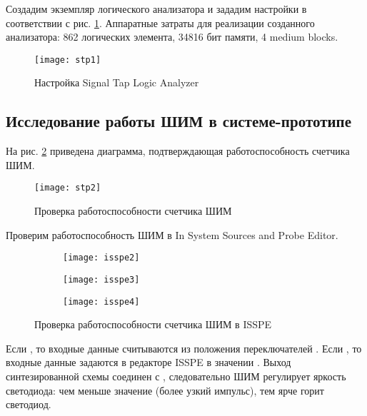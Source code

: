 Создадим экземпляр логического анализатора  и зададим настройки в соответствии с рис. \ref{fig:stp1}. Аппаратные затраты для реализации созданного анализатора: 862 логических элемента, 34816 бит памяти, 4 medium blocks.

\begin{figure}[H]
	\begin{center}
		\texttt{[image: stp1]}
		\caption{Настройка Signal Tap Logic Analyzer}
		\label{fig:stp1}
	\end{center}
\end{figure}
\vspace{-0.5cm}

\subsection{Исследование работы ШИМ в системе-прототипе}

На рис. \ref{fig:stp2} приведена диаграмма, подтверждающая работоспособность счетчика ШИМ.
\begin{figure}[H]
	\begin{center}
		\texttt{[image: stp2]}
		\caption{Проверка работоспособности счетчика ШИМ}
		\label{fig:stp2}
	\end{center}
\end{figure}
\vspace{-0.5cm}

Проверим работоспособность ШИМ в In System Sources and Probe Editor.
\begin{figure}[H]
	\centering
	\begin{subfigure}[b]{\textwidth}
		\centering
		\texttt{[image: isspe2]}
		\vspace{0.2cm}
	\end{subfigure}
	\begin{subfigure}[b]{\textwidth}
		\centering
		\texttt{[image: isspe3]}
		\vspace{0.2cm}
	\end{subfigure}
	\begin{subfigure}[b]{\textwidth}
		\centering
		\texttt{[image: isspe4]}
	\end{subfigure}
	\caption{Проверка работоспособности счетчика ШИМ в ISSPE}
	\label{fig:isspe2}
\end{figure}

Если , то входные данные считываются из положения переключателей . Если , то входные данные задаются в редакторе ISSPE в значении . Выход синтезированной схемы соединен с , следовательно ШИМ регулирует яркость светодиода: чем меньше значение  (более узкий импульс), тем ярче горит светодиод.

